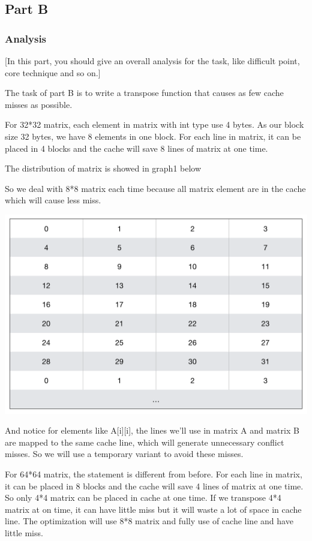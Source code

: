 \documentclass{article}
\begin{document}
\subsection{Part B}

\subsubsection{Analysis}

[In this part, you should give an overall analysis for the task, like difficult point, core technique and so on.]

The task of part B is to write a transpose function that causes as few cache misses as possible. 

For 32*32 matrix, each element in matrix with int type use 4 bytes. As our block size 32 bytes, we have 
8 elements in one block. For each line in matrix, it can be placed in 4 blocks and the cache will save 8 lines of matrix at one time.

The distribution of matrix is showed in graph1 below

So we deal with 8*8 matrix each time because all matrix element are in the cache which will cause less miss. 

\includegraphics[scale=0.35]{2.png}

And notice for elements like A[i][i], the lines we’ll use in matrix A and matrix B are mapped to the same cache line, which will generate unnecessary conflict misses. So we will use a temporary variant to avoid these misses.

For 64*64 matrix, the statement is different from before. For each line in matrix, it can be placed in 8 blocks and the cache will save 4 lines of matrix at one time. So only 4*4 matrix can be placed in cache at one time. If we transpose 4*4 matrix at on time, it can have little miss but it will waste a lot of space in cache line. The optimization will use 8*8 matrix and fully use of cache line and have little miss.
\end{document}
